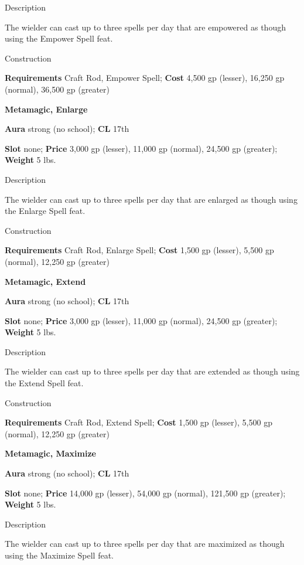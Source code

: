 Description
				
The wielder can cast up to three spells per day that are empowered as though using the Empower Spell feat. 
				
Construction
				
\textbf{Requirements} Craft Rod, Empower Spell; \textbf{Cost }4,500 gp (lesser), 16,250 gp (normal), 36,500 gp (greater)
				
\textbf{Metamagic, Enlarge}
				
\textbf{Aura} strong (no school);\textbf{ CL }17th
				
\textbf{Slot} none; \textbf{Price} 3,000 gp (lesser), 11,000 gp (normal), 24,500 gp (greater); \textbf{Weight} 5 lbs.
				
Description
				
The wielder can cast up to three spells per day that 
are enlarged
 as though using the Enlarge Spell feat. 
				
Construction
				
\textbf{Requirements} Craft Rod, Enlarge Spell; \textbf{Cost }1,500 gp (lesser), 5,500 gp (normal), 12,250 gp (greater)
				
\textbf{Metamagic, Extend}
				
\textbf{Aura} strong (no school);\textbf{ CL }17th
				
\textbf{Slot} none; \textbf{Price} 3,000 gp (lesser), 11,000 gp (normal), 24,500 gp (greater); \textbf{Weight} 5 lbs.
				
Description
				
The wielder can cast up to three spells per day that 
are extended
 as though using the Extend Spell feat. 
				
Construction
				
\textbf{Requirements} Craft Rod, Extend Spell; \textbf{Cost }1,500 gp (lesser), 5,500 gp (normal), 12,250 gp (greater)
				
\textbf{Metamagic, Maximize}
				
\textbf{Aura} strong (no school);\textbf{ CL }17th
				
\textbf{Slot} none; \textbf{Price} 14,000 gp (lesser), 54,000 gp (normal), 121,500 gp (greater); \textbf{Weight} 5 lbs.
				
Description
				
The wielder can cast up to three spells per day that 
are maximized
 as though using the Maximize Spell feat. 
				
